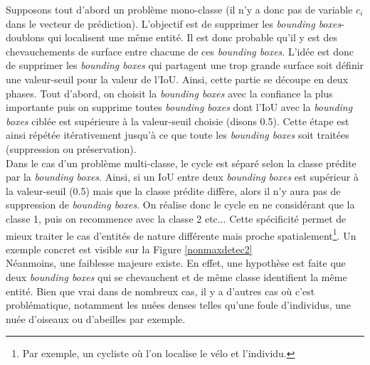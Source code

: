 \noindent Supposons tout d'abord un problème mono-classe (il n'y a donc pas de variable $c_i$ dans le vecteur de prédiction). L'objectif est de supprimer les \textit{bounding boxes}-doublons qui localisent une même entité. Il est donc probable qu'il y est des chevauchements de surface entre chacune de ces \textit{bounding boxes}. L'idée est donc de supprimer les \textit{bounding boxes} qui partagent une trop grande surface soit définir une valeur-seuil pour la valeur de l'IoU. Ainsi, cette partie se découpe en deux phases. Tout d'abord, on choisit la \textit{bounding boxes} avec la confiance la plus importante puis on supprime toutes \textit{bounding boxes} dont l'IoU avec la \textit{bounding boxes} ciblée est supérieure à la valeur-seuil choisie (disons 0.5). Cette étape est ainsi répétée itérativement jusqu'à ce que toute les \textit{bounding boxes} soit traitées (suppression ou préservation).\\

\noindent Dans le cas d'un problème multi-classe, le cycle est séparé selon la classe prédite par la \textit{bounding boxes}. Ainsi, si un IoU entre deux \textit{bounding boxes} est supérieur à la valeur-seuil (0.5) mais que la classe prédite diffère, alors il n'y aura pas de suppression de \textit{bounding boxes}. On réalise donc le cycle en ne considérant que la classe 1, puis on recommence avec la classe 2 etc... Cette spécificité permet de mieux traiter le cas d'entités de nature différente mais proche spatialement\footnote{Par exemple, un cycliste où l'on localise le vélo et l'individu.}. Un exemple concret est visible sur la Figure \ref{nonmaxdetec2}\\

\noindent Néanmoins, une faiblesse majeure existe. En effet, une hypothèse est faite que deux \textit{bounding boxes} qui se chevauchent et de même classe identifient la même entité. Bien que vrai dans de nombreux cas, il y a d'autres cas où c'est problématique, notamment les nuées denses telles qu'une foule d'individus, une nuée d'oiseaux ou d'abeilles par exemple.


